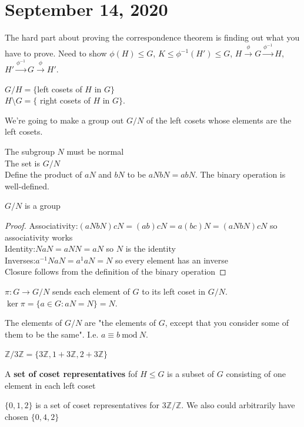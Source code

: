 \documentclass{article}
\newcommand{\vocab}[1]{\textbf{\color{blue!90}\boldmath #1}}
\newcommand{\Z}{\mathbb{Z}}
\renewcommand{\mod}[1]{\ \text{mod}\ #1}
\newcommand{\ra}[1][]{\xrightarrow{#1}}
\begin{document}
\section{September 14, 2020}
The hard part about proving the correspondence theorem is finding out what you have to prove. Need to show $\phi(H)\leq G$, $K\leq\phi^{-1}(H')\leq G$, $H\ra[\phi]G\ra[\phi^{-1}]H$, $H'\ra[\phi^{-1}]G\ra[\phi]H'$. 
\begin{definition}
    $G/H=\{$left cosets of $H$ in $G\}$\\
    $H$\textbackslash $G=\{$ right cosets of $H$ in $G\}$.
\end{definition}
We're going to make a group out $G/N$ of the left cosets whose elements are the left cosets. 
\begin{definition}
The subgroup $N$ must be normal\\
The set is $G/N$\\
Define the product of $aN$ and $bN$ to be $aNbN=abN$. The binary operation is well-defined.
\end{definition}
\begin{theorem}
$G/N$ is a group
\end{theorem}
\begin{proof}
Associativity:$(aNbN)cN=(ab)cN=a(bc)N=(aNbN)cN$ so associativity works\\
Identity:$NaN=aNN=aN$ so $N$ is the identity\\
Inverses:$a^{-1}NaN=a^{1}aN=N$ so every element has an inverse\\
Closure follows from the definition of the binary operation
\end{proof}
\begin{definition}
$\pi:G\ra G/N$ sends each element of $G$ to its left coset in $G/N$.\\
$\ker\pi=\{a\in G:aN=N\}=N$.
\end{definition}
\begin{fact}
The elements of $G/N$ are "the elements of $G$, except that you consider some of them to be the same". I.e. $a\equiv b \mod{N}$.
\end{fact}
\begin{example}
$\Z/3\Z=\{3\Z,1+3\Z,2+3\Z\}$
\end{example}
\begin{definition}
A \vocab{set of coset representatives} fof $H\leq G$ is a subset of $G$ consisting of one element in each left coset
\end{definition}
\begin{example}
$\{0,1,2\}$ is a set of coset representatives for $3\Z/\Z$. We also could arbitrarily have chosen $\{0,4,2\}$
\end{example}
\end{document}
